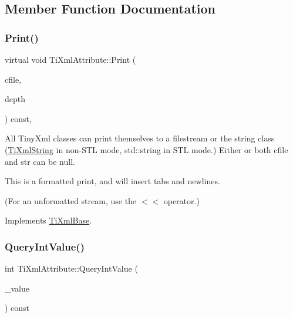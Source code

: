 \subsection{Member Function Documentation}
\hypertarget{class_ti_xml_attribute_a68ae373e03b9c35be4c9d0c3c233b894}{}\label{class_ti_xml_attribute_a68ae373e03b9c35be4c9d0c3c233b894} 
\subsubsection{\texorpdfstring{Print()}{Print()}}
{\footnotesize\ttfamily virtual void Ti\+Xml\+Attribute\+::\+Print (\begin{DoxyParamCaption}\item[{F\+I\+LE $\ast$}]{cfile,  }\item[{int}]{depth }\end{DoxyParamCaption}) const\hspace{0.3cm}{\ttfamily [inline]}, {\ttfamily [virtual]}}

All Tiny\+Xml classes can print themselves to a filestream or the string class (\hyperlink{class_ti_xml_string}{Ti\+Xml\+String} in non-\/\+S\+TL mode, std\+::string in S\+TL mode.) Either or both cfile and str can be null.

This is a formatted print, and will insert tabs and newlines.

(For an unformatted stream, use the $<$$<$ operator.) 

Implements \hyperlink{class_ti_xml_base_a0de56b3f2ef14c65091a3b916437b512}{Ti\+Xml\+Base}.

\hypertarget{class_ti_xml_attribute_a6caa8090d2fbb7966700a16e45ed33de}{}\label{class_ti_xml_attribute_a6caa8090d2fbb7966700a16e45ed33de} 
\subsubsection{\texorpdfstring{Query\+Int\+Value()}{QueryIntValue()}}
{\footnotesize\ttfamily int Ti\+Xml\+Attribute\+::\+Query\+Int\+Value (\begin{DoxyParamCaption}\item[{int $\ast$}]{\+\_\+value }\end{DoxyParamCaption}) const}

